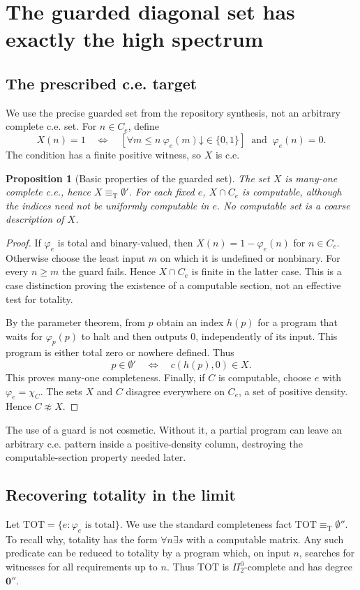 \documentclass[11pt,letterpaper]{article}
\newtheorem{proposition}[theorem]{Proposition}
\theoremstyle{definition}
\theoremstyle{remark}\newtheorem{remark}[theorem]{Remark}
\numberwithin{equation}{section}
\newcommand{\eqT}{\equiv_{\mathrm T}}
\newcommand{\TOT}{\mathrm{TOT}}
\newcommand{\zero}{\mathbf 0}
\newcommand{\hal}{\mathord\downarrow}
\begin{document}
\section{The guarded diagonal set has exactly the high spectrum}
\label{cr13:sec:guarded}
\subsection{The prescribed c.e. target}
We use the precise guarded set from the repository synthesis, not an arbitrary complete c.e. set. For $n\in C_e$, define
\begin{equation}\label{cr13:eq:guard}
 X(n)=1\quad\Longleftrightarrow\quad
 [\forall m\le n\ \varphi_e(m)\hal\in\{0,1\}]
 \ \text{ and }\ \varphi_e(n)=0.
\end{equation}
The condition has a finite positive witness, so $X$ is c.e.

\begin{proposition}[Basic properties of the guarded set]\label{cr13:prop:guardbasic}
The set $X$ is many-one complete c.e., hence $X\eqT\emptyset'$. For each fixed $e$, $X\cap C_e$ is computable, although the indices need not be uniformly computable in $e$. No computable set is a coarse description of $X$.
\end{proposition}
\begin{proof}
If $\varphi_e$ is total and binary-valued, then $X(n)=1-\varphi_e(n)$ for $n\in C_e$. Otherwise choose the least input $m$ on which it is undefined or nonbinary. For every $n\ge m$ the guard fails. Hence $X\cap C_e$ is finite in the latter case. This is a case distinction proving the existence of a computable section, not an effective test for totality.

By the parameter theorem, from $p$ obtain an index $h(p)$ for a program that waits for $\varphi_p(p)$ to halt and then outputs $0$, independently of its input. This program is either total zero or nowhere defined. Thus
\[
           p\in\emptyset'\quad\Longleftrightarrow\quad
           c(h(p),0)\in X.
\]
This proves many-one completeness. Finally, if $C$ is computable, choose $e$ with $\varphi_e=\chi_C$. The sets $X$ and $C$ disagree everywhere on $C_e$, a set of positive density. Hence $C\not\approx X$.
\end{proof}
The use of a guard is not cosmetic. Without it, a partial program can leave an arbitrary c.e. pattern inside a positive-density column, destroying the computable-section property needed later.

\subsection{Recovering totality in the limit}
Let $\TOT=\{e:\varphi_e\text{ is total}\}$. We use the standard completeness fact $\TOT\eqT\emptyset''$. To recall why, totality has the form $\forall n\exists s$ with a computable matrix. Any such predicate can be reduced to totality by a program which, on input $n$, searches for witnesses for all requirements up to $n$. Thus $\TOT$ is $\Pi^0_2$-complete and has degree $\zero''$.
\end{document}
